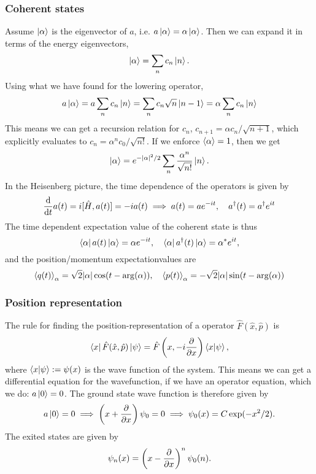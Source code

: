 \subsubsection*{Coherent states}
Assume $\ket \alpha$ is the eigenvector of $a$, i.e. $a \ket \alpha = \alpha \ket \alpha$. Then we can expand it in terms of the energy eigenvectors,
\begin{equation*}
    \ket \alpha = \sum_n c_n \ket n.
\end{equation*}
Using what we have found for the lowering operator,
\begin{equation*}
    a \ket \alpha = a\sum_n c_n \ket n = \sum_n c_n \sqrt n \ket{n-1} = \alpha \sum_n c_n \ket n 
\end{equation*}
This means we can get a recursion relation for $c_n$, $c_{n+1} = \alpha {c_n}/{\sqrt{n + 1}}$, which explicitly evaluates to $c_n = \alpha^n {c_0}/{\sqrt{n!}}$. If we enforce $\braket{\alpha} = 1$, then we get
\begin{equation}
    \ket \alpha = e^{-|\alpha|^2/2}\sum_n \frac{\alpha^n}{\sqrt{n!}}\ket n.
\end{equation}
In the Heisenberg picture, the time dependence of the operators is given by
\begin{equation*}
    \odv{}{t} a(t) = i[\hat H, a(t)] = -ia(t) \implies a(t) = a e^{-it}, \quad a^\dagger(t) = a^\dagger e^{it}
\end{equation*}
The time dependent expectation value of the coherent state is thus
\begin{equation*}
    \bra{\alpha}a(t)\ket{\alpha} = \alpha e^{-it}, \quad \bra{\alpha}a^\dagger(t)\ket{\alpha} = \alpha^* e^{it},
\end{equation*}
and the position/momentum expectationvalues are
\begin{equation*}
    \left \langle q(t) \right \rangle_\alpha = \sqrt{2} |\alpha| \cos(t - \arg(\alpha)), \quad \left \langle p(t) \right \rangle_\alpha = -\sqrt{2} |\alpha| \sin(t - \arg(\alpha ))
\end{equation*}

\subsubsection*{Position representation}
The rule for finding the position-representation of a operator $\hat F(\hat x, \hat p)$ is
\begin{equation*}
    \bra{x}\hat F(\hat x, \hat p)\ket{\psi} = \hat F\left(x, -i \pdv{}{x}\right) \braket{x|\psi},
\end{equation*}
where $\braket{x | \psi} := \psi(x)$ is the wave function of the system. This means we can get a differential equation for the wavefunction, if we have an operator equation, which we do: $a \ket 0 = 0$. The ground state wave function is therefore given by
\begin{equation*}
    a \ket 0 = 0 \implies \left(x + \pdv{}{x}\right)\psi_0 = 0 \implies \psi_0(x) = C \exp(-x^2/2).
\end{equation*}
The exited states are given by
\begin{equation*}
    \psi_n(x) = \left(x - \pdv{}{x}\right)^n \psi_0(n).
\end{equation*}

